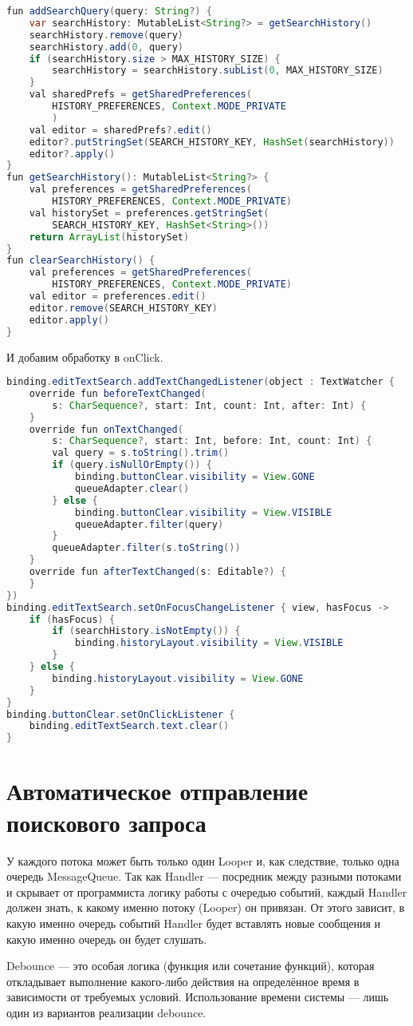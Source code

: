 \begin{lstlisting}[language=Java]
fun addSearchQuery(query: String?) {
	var searchHistory: MutableList<String?> = getSearchHistory()
	searchHistory.remove(query)
	searchHistory.add(0, query)
	if (searchHistory.size > MAX_HISTORY_SIZE) {
		searchHistory = searchHistory.subList(0, MAX_HISTORY_SIZE)
	}
	val sharedPrefs = getSharedPreferences(
		HISTORY_PREFERENCES, Context.MODE_PRIVATE
		)
	val editor = sharedPrefs?.edit()
	editor?.putStringSet(SEARCH_HISTORY_KEY, HashSet(searchHistory))
	editor?.apply()
}
fun getSearchHistory(): MutableList<String?> {
	val preferences = getSharedPreferences(
		HISTORY_PREFERENCES, Context.MODE_PRIVATE)
	val historySet = preferences.getStringSet(
		SEARCH_HISTORY_KEY, HashSet<String>())
	return ArrayList(historySet)
}
fun clearSearchHistory() {
	val preferences = getSharedPreferences(
		HISTORY_PREFERENCES, Context.MODE_PRIVATE)
	val editor = preferences.edit()
	editor.remove(SEARCH_HISTORY_KEY)
	editor.apply()
}
\end{lstlisting}

И добавим обработку в onClick.

\begin{lstlisting}[language=Java]
binding.editTextSearch.addTextChangedListener(object : TextWatcher {
	override fun beforeTextChanged(
		s: CharSequence?, start: Int, count: Int, after: Int) {
	}
	override fun onTextChanged(
		s: CharSequence?, start: Int, before: Int, count: Int) {
		val query = s.toString().trim()
		if (query.isNullOrEmpty()) {
			binding.buttonClear.visibility = View.GONE
			queueAdapter.clear()
		} else {
			binding.buttonClear.visibility = View.VISIBLE
			queueAdapter.filter(query)
		}
		queueAdapter.filter(s.toString())
	}
	override fun afterTextChanged(s: Editable?) {
	}
})
binding.editTextSearch.setOnFocusChangeListener { view, hasFocus ->
	if (hasFocus) {
		if (searchHistory.isNotEmpty()) {
			binding.historyLayout.visibility = View.VISIBLE
		}
	} else {
		binding.historyLayout.visibility = View.GONE
	}
}
binding.buttonClear.setOnClickListener {
	binding.editTextSearch.text.clear()
}
\end{lstlisting}

\section{Автоматическое отправление поискового запроса}

У каждого потока может быть только один Looper и, как следствие, только
одна очередь MessageQueue. Так как Handler --- посредник между разными
потоками и скрывает от программиста логику работы с очередью событий,
каждый Handler должен знать, к какому именно потоку (Looper) он привязан.
От этого зависит, в какую именно очередь событий Handler будет вставлять
новые сообщения и какую именно очередь он будет слушать.\par
Debounce --- это особая логика (функция или сочетание функций), которая
откладывает выполнение какого-либо действия на определённое время в
зависимости от требуемых условий. Использование времени системы --- лишь
один из вариантов реализации debounce.\par

